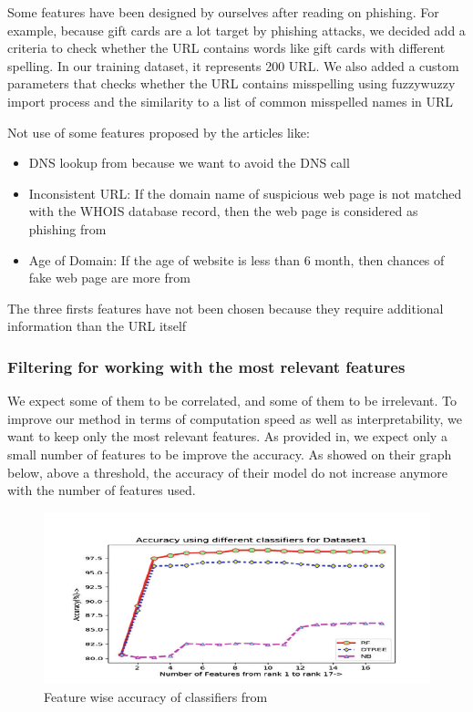\documentclass{article}
\begin{document}
    Some features have been designed by ourselves after reading on phishing.
    For example, because gift cards are a lot target by phishing attacks, we decided add a criteria to check whether the URL contains words like gift cards with different spelling.
    In our training dataset, it represents 200 URL.
    We also added a custom parameters that checks whether the URL contains misspelling using fuzzywuzzy import process and the similarity to a list of common misspelled names in URL

    Not use of some features proposed by the articles like:
    \begin{itemize}
        \item DNS lookup from\cite{PhishSafe} because we want to avoid the DNS call
        \item Inconsistent URL: If the domain name of suspicious web page is not matched
with the WHOIS database record, then the web page is considered as phishing from\cite{PhishSafe}
        \item Age of Domain: If the age of website is less than 6 month, then chances of fake
web page are more from\cite{PhishSafe}
    \end{itemize}
    The three firsts features have not been chosen because they require additional information than the URL itself

    \subsubsection{Filtering for working with the most relevant features}

    We expect some of them to be correlated, and some of them to be irrelevant.
    To improve our method in terms of computation speed as well as interpretability, we want to keep only the most relevant features.
    As provided in\cite{LexicalFeatureSelection}, we expect only a small number of features to be improve the accuracy.
    As showed on their graph below, above a threshold, the accuracy of their model do not increase anymore with the number of features used.

    \begin{figure}[H]
        \centering
        \includegraphics[width=\textwidth]{report_img/lexicalfeatureselectionaccuracygraph}
        \caption{Feature wise accuracy of classifiers from\cite{LexicalFeatureSelection}}
        \label{fig:}
    \end{figure}
\end{document}

